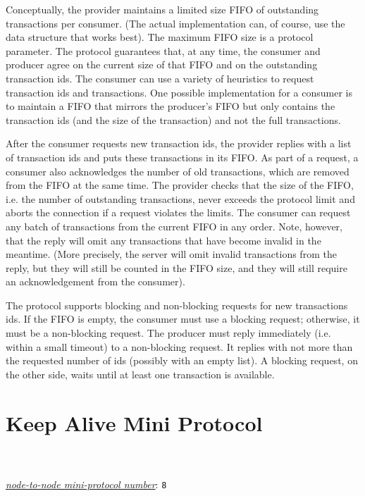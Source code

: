 Conceptually, the provider maintains a limited size FIFO of outstanding transactions per consumer.
(The actual implementation can, of course, use the data structure that works best).
The maximum FIFO size is a protocol parameter.
The protocol guarantees that, at any time, the consumer and producer agree on the current size of
that FIFO and on the outstanding transaction ids.
The consumer can use a variety of heuristics to request transaction ids and transactions.
One possible implementation for a consumer is to maintain a FIFO that mirrors the producer's FIFO
but only contains the transaction ids (and the size of the transaction) and not the full transactions.

After the consumer requests new transaction ids, the provider replies with a list of transaction ids and
puts these transactions in its FIFO.
As part of a request, a consumer also acknowledges the number of old transactions,
which are removed from the FIFO at the same time.
The provider checks that the size of the FIFO, i.e. the number of outstanding transactions,
never exceeds the protocol limit and aborts the connection if a request violates the limits.
The consumer can request any batch of transactions from the current FIFO in any order.
Note, however, that the reply will omit any transactions that have become invalid in the meantime.
(More precisely, the server will omit invalid transactions from the reply, but they will still be counted in the FIFO
size, and they will still require an acknowledgement from the consumer).

The protocol supports blocking and non-blocking requests for new transactions ids.
If the FIFO is empty, the consumer must use a blocking request; otherwise, it must be a non-blocking request.
The producer must reply immediately (i.e. within a small timeout) to a non-blocking request.
It replies with not more than the requested number of ids (possibly with an empty list).
A blocking request, on the other side, waits until at least one transaction is available.

\section{Keep Alive Mini Protocol}
\\
\\
\hyperref[table:node-to-node-protocol-numbers]{\textit{node-to-node mini-protocol number}}: \texttt{8}\\

